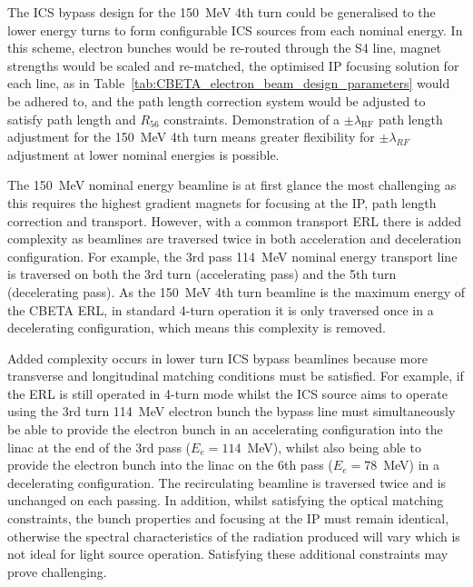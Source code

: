 \documentclass[../main.tex]{subfiles}
\begin{document}
The ICS bypass design for the 150~\si{\mega\electronvolt} 4th turn could be generalised to the lower energy turns to form configurable ICS sources from each nominal energy. In this scheme, electron bunches would be re-routed through the S4 line, magnet strengths would be scaled and re-matched, the optimised IP focusing solution for each line, as in Table~\ref{tab:CBETA_electron_beam_design_parameters} would be adhered to, and the path length correction system would be adjusted to satisfy path length and $R_{56}$ constraints. Demonstration of a $\pm\lambda_{\mathrm{RF}}$ path length adjustment for the 150~\si{\mega\electronvolt} 4th turn means greater flexibility for $\pm\lambda_{RF}$ adjustment at lower nominal energies is possible.

The 150~\si{\mega\electronvolt} nominal energy beamline is at first glance the most challenging as this requires the highest gradient magnets for focusing at the IP, path length correction and transport. However, with a common transport ERL there is added complexity as beamlines are traversed twice in both acceleration and deceleration configuration. For example, the 3rd pass 114~\si{\mega\electronvolt} nominal energy transport line is traversed on both the 3rd turn (accelerating pass) and the 5th turn (decelerating pass). As the 150~\si{\mega\electronvolt} 4th turn beamline is the maximum energy of the CBETA ERL, in standard 4-turn operation it is only traversed once in a decelerating configuration, which means this complexity is removed.

Added complexity occurs in lower turn ICS bypass beamlines because more transverse and longitudinal matching conditions must be satisfied. For example, if the ERL is still operated in 4-turn mode whilst the ICS source aims to operate using the 3rd turn 114~\si{\mega\electronvolt} electron bunch the bypass line must simultaneously be able to provide the electron bunch in an accelerating configuration into the linac at the end of the 3rd pass ($E_{e} = 114$~\si{\mega\electronvolt}), whilst also being able to provide the electron bunch into the linac on the 6th pass ($E_{e} = 78$~\si{\mega\electronvolt}) in a decelerating configuration. The recirculating beamline is traversed twice and is unchanged on each passing. In addition, whilst satisfying the optical matching constraints, the bunch properties and focusing at the IP must remain identical, otherwise the spectral characteristics of the radiation produced will vary which is not ideal for light source operation. Satisfying these additional constraints may prove challenging.
\end{document}

